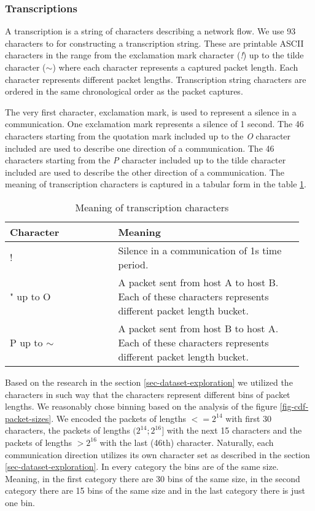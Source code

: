 \documentclass{article}
\begin{document}
\subsubsection{Transcriptions}\label{sec-transcriptions}

A transcription is a string of characters describing a network flow. We use 93 characters to for constructing a transcription string. These are printable ASCII characters in the range from the exclamation mark character (\textit{!}) up to the tilde character (\textit{$\sim$}) where each character represents a captured packet length. Each character represents different packet lengths. Transcription string characters are ordered in the same chronological order as the packet captures.

The very first character, exclamation mark, is used to represent a silence in a communication. One exclamation mark represents a silence of 1 second. The 46 characters starting from the quotation mark included up to the \textit{O} character included are used to describe one direction of a communication. The 46 characters starting from the \textit{P} character included up to the tilde character included are used to describe the other direction of a communication. The meaning of transcription characters is captured in a tabular form in the table \ref{tab:character-meanings}.

\begin{table}[h!]
\centering
\begin{tabular}{ |p{0.35\linewidth} | p{0.6\linewidth}| }
 \hline
 Character & Meaning \\
 \hline \hline
 ! & Silence in a communication of 1s time period. \\
 \hline
 " up to O & A packet sent from host A to host B. Each of these characters represents different packet length bucket. \\
 \hline
 P up to $\sim$ & A packet sent from host B to host A. Each of these characters represents different packet length bucket. \\
 \hline
\end{tabular}
\caption{Meaning of transcription characters}
\label{tab:character-meanings}
\end{table}

Based on the research in the section \ref{sec-dataset-exploration} we utilized the characters in such way that the characters represent different bins of packet lengths. We reasonably chose binning based on the analysis of the figure \ref{fig-cdf-packet-sizes}. We encoded the packets of lengths $<= 2^{14}$ with first 30 characters, the packets of lengths $(2^{14}; 2^{16}]$ with the next 15 characters and the packets of lengths $> 2^{16}$ with the last (46th) character. Naturally, each communication direction utilizes its own character set as described in the section \ref{sec-dataset-exploration}. In every category the bins are of the same size. Meaning, in the first category there are 30 bins of the same size, in the second category there are 15 bins of the same size and in the last category there is just one bin.
\end{document}
